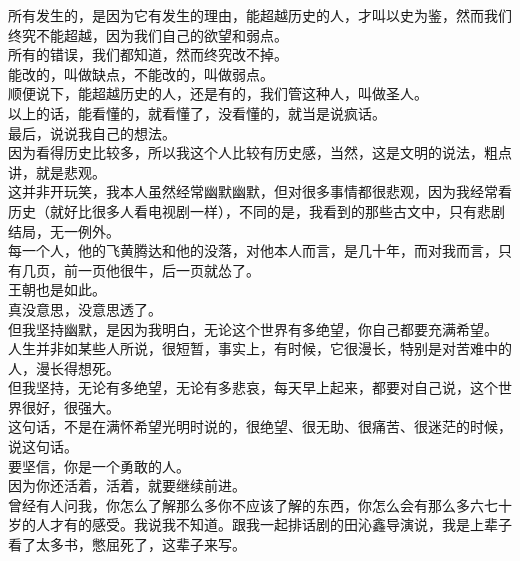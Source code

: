 \begin{multicols}{\theparacolNo}
所有发生的，是因为它有发生的理由，能超越历史的人，才叫以史为鉴，然而我们终究不能超越，因为我们自己的欲望和弱点。\\

所有的错误，我们都知道，然而终究改不掉。\\

能改的，叫做缺点，不能改的，叫做弱点。\\

顺便说下，能超越历史的人，还是有的，我们管这种人，叫做圣人。\\

以上的话，能看懂的，就看懂了，没看懂的，就当是说疯话。\\

最后，说说我自己的想法。\\

因为看得历史比较多，所以我这个人比较有历史感，当然，这是文明的说法，粗点讲，就是悲观。\\

这并非开玩笑，我本人虽然经常幽默幽默，但对很多事情都很悲观，因为我经常看历史（就好比很多人看电视剧一样），不同的是，我看到的那些古文中，只有悲剧结局，无一例外。\\

每一个人，他的飞黄腾达和他的没落，对他本人而言，是几十年，而对我而言，只有几页，前一页他很牛，后一页就怂了。\\

王朝也是如此。\\

真没意思，没意思透了。\\

但我坚持幽默，是因为我明白，无论这个世界有多绝望，你自己都要充满希望。\\

人生并非如某些人所说，很短暂，事实上，有时候，它很漫长，特别是对苦难中的人，漫长得想死。\\

但我坚持，无论有多绝望，无论有多悲哀，每天早上起来，都要对自己说，这个世界很好，很强大。\\

这句话，不是在满怀希望光明时说的，很绝望、很无助、很痛苦、很迷茫的时候，说这句话。\\

要坚信，你是一个勇敢的人。\\

因为你还活着，活着，就要继续前进。\\

曾经有人问我，你怎么了解那么多你不应该了解的东西，你怎么会有那么多六七十岁的人才有的感受。我说我不知道。跟我一起排话剧的田沁鑫导演说，我是上辈子看了太多书，憋屈死了，这辈子来写。\\


\end{multicols}

